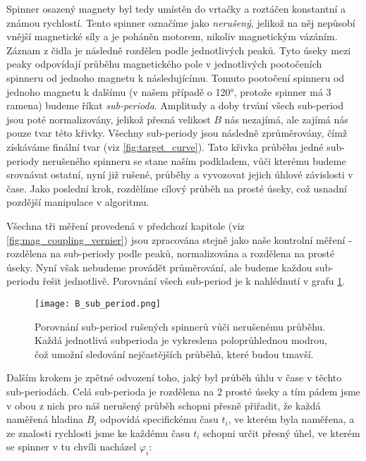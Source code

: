 Spinner osazený magnety byl tedy umístěn do vrtačky a roztáčen konstantní a známou rychlostí. Tento spinner označíme jako \textit{nerušený}, jelikož na něj nepůsobí vnější magnetické síly a je poháněn motorem, nikoliv magnetickým vázáním. Záznam z čidla je následně rozdělen podle jednotlivých peaků. Tyto úseky mezi peaky odpovídají průběhu magnetického pole v jednotlivých pootočeních spinneru od jednoho magnetu k následujícímu. Tomuto pootočení spinneru od jednoho magnetu k dalšímu (v našem případě o 120°, protože spinner má 3 ramena) budeme říkat \textit{sub-perioda}. Amplitudy a doby trvání všech sub-period jsou poté normalizovány, jelikož přesná velikost $B$ nás nezajímá, ale zajímá nás pouze tvar této křivky. Všechny sub-periody jsou následně zprůměrovány, čímž získáváme finální tvar (viz \autoref{fig:target_curve}). Tato křivka průběhu jedné sub-periody nerušeného spinneru se stane naším podkladem, vůči kterému budeme srovnávat ostatní, nyní již rušené, průběhy a vyvozovat jejich úhlové závislosti v čase. Jako poslední krok, rozdělíme cílový průběh na prosté úseky, což usnadní pozdější manipulace v algoritmu.

Všechna tři měření provedená v předchozí kapitole (viz \autoref{fig:mag_coupling_vernier}) jsou zpracována stejně jako naše kontrolní měření - rozdělena na sub-periody podle peaků, normalizována a rozdělena na prosté úseky. Nyní však nebudeme provádět průměrování, ale budeme každou sub-periodu řešit jednotlivě. Porovnání všech sub-period je k nahlédnutí v grafu \ref{fig:B_sub_periods}.

\clearpage

\begin{figure}[H]
    \texttt{[image: B\_sub\_period.png]}
    \centering
    \caption[Porovnání sub-period rušených spinnerů vůči nerušenému průběhu]{Porovnání sub-period rušených spinnerů vůči nerušenému průběhu. Každá jednotlivá subperioda je vykreslena poloprůhlednou modrou, čož umožní sledování nejčastějších průběhů, které budou tmavší.}
    \label{fig:B_sub_periods}
\end{figure}

Dalším krokem je zpětné odvození toho, jaký byl průběh úhlu v čase v těchto sub-periodách. Celá sub-perioda je rozdělena na 2 prosté úseky a tím pádem jsme v obou z nich pro náš nerušený průběh schopni přesně přiřadit, že každá naměřená hladina $B_i$ odpovídá specifickému času $t_i$, ve kterém byla naměřena, a ze znalosti rychlosti jsme ke každému času $t_i$ schopni určit přesný úhel, ve kterém se spinner v tu chvíli nacházel $\varphi_i$:

